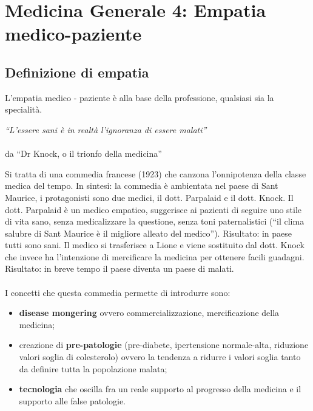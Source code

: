 \section{Medicina Generale 4: Empatia medico-paziente}

\subsection{Definizione di empatia}

L'empatia medico - paziente è alla base della professione, qualsiasi sia
la specialità.

\emph{``L'essere sani è in realtà l'ignoranza di essere malati''}
\\\\
da ``Dr Knock, o il trionfo della medicina''

Si tratta di una commedia francese (1923) che canzona l'onnipotenza
della classe medica del tempo. In sintesi: la commedia è ambientata nel
paese di Sant Maurice, i protagonisti sono due medici, il dott.
Parpalaid e il dott. Knock. Il dott. Parpalaid è un medico empatico,
suggerisce ai pazienti di seguire uno stile di vita sano, senza
medicalizzare la questione, senza toni paternalistici (``il clima
salubre di Sant Maurice è il migliore alleato del medico''). Risultato:
in paese tutti sono sani. Il medico si trasferisce a Lione e viene
sostituito dal dott. Knock che invece ha l'intenzione di mercificare la
medicina per ottenere facili guadagni. Risultato: in breve tempo il
paese diventa un paese di malati.
\\\\
I concetti che questa commedia permette di introdurre sono:

\begin{itemize}
\item
  \textbf{disease mongering} ovvero commercializzazione, mercificazione
  della medicina;
\item
  creazione di \textbf{pre-patologie} (pre-diabete, ipertensione
  normale-alta, riduzione valori soglia di colesterolo) ovvero la
  tendenza a ridurre i valori soglia tanto da definire tutta la
  popolazione malata;
\item
  \textbf{tecnologia} che oscilla fra un reale supporto al progresso
  della medicina e il supporto alle false patologie.
\end{itemize}

